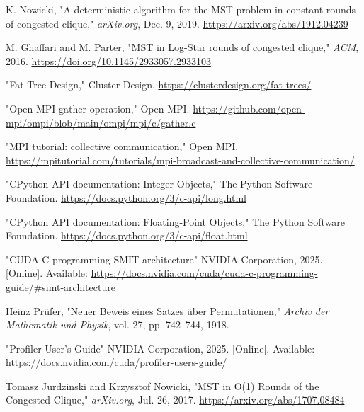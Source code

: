 \documentclass[english, 12pt, a4paper, elec, utf8, a-2b, online]{aaltothesis}
\begin{document}
\begin{thebibliography}{99}
	K. Nowicki, "A deterministic algorithm for the MST problem in constant rounds of congested clique," 
	\textit{arXiv.org}, Dec. 9, 2019. 
	\url{https://arxiv.org/abs/1912.04239}
	
	M. Ghaffari and M. Parter, "MST in Log-Star rounds of congested clique," 
	\textit{ACM}, 2016. 
	\url{https://doi.org/10.1145/2933057.2933103}
	
	"Fat-Tree Design," Cluster Design. 
	\url{https://clusterdesign.org/fat-trees/}
	
	"Open MPI gather operation," Open MPI. 
	\url{https://github.com/open-mpi/ompi/blob/main/ompi/mpi/c/gather.c}
	
	"MPI tutorial: collective communication," Open MPI. 
	\url{https://mpitutorial.com/tutorials/mpi-broadcast-and-collective-communication/}
	
	"CPython API documentation: Integer Objects," The Python Software Foundation. 
	\url{https://docs.python.org/3/c-api/long.html}
	
	"CPython API documentation: Floating-Point Objects," The Python Software Foundation. 
	\url{https://docs.python.org/3/c-api/float.html}

	 "CUDA C programming SMIT architecture" NVIDIA Corporation, 2025. [Online]. Available: \url{https://docs.nvidia.com/cuda/cuda-c-programming-guide/#simt-architecture}

	 Heinz Prüfer, "Neuer Beweis eines Satzes über Permutationen,"  \textit{Archiv der Mathematik und Physik}, vol. 27, pp. 742–744, 1918.

	 "Profiler User’s Guide" NVIDIA Corporation, 2025. [Online]. Available: \url{	https://docs.nvidia.com/cuda/profiler-users-guide/}

	Tomasz Jurdzinski and Krzysztof Nowicki, "MST in O(1) Rounds of the Congested Clique," 
	\textit{arXiv.org}, Jul. 26, 2017. 
	\url{https://arxiv.org/abs/1707.08484}
\end{thebibliography}
\end{document}
